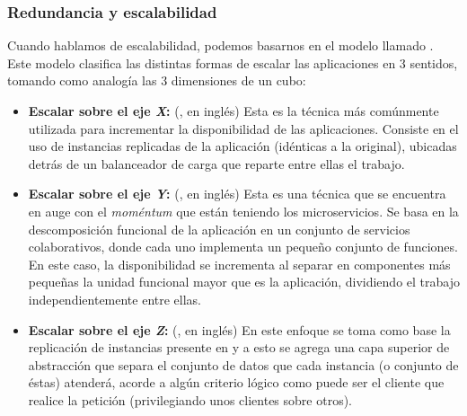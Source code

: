 \subsubsection{Redundancia y escalabilidad}


Cuando hablamos de escalabilidad, podemos basarnos en el modelo llamado \cite{website:akfpartners-scale-cube}. Este modelo clasifica las distintas formas de escalar las aplicaciones en 3 sentidos, tomando como analogía las 3 dimensiones de un cubo:

\begin{itemize}
  \item \textbf{Escalar sobre el eje \textit{X}:} (, en inglés) Esta es la técnica más comúnmente utilizada para incrementar la disponibilidad de las aplicaciones. Consiste en el uso de instancias replicadas de la aplicación (idénticas a la original), ubicadas detrás de un balanceador de carga que reparte entre ellas el trabajo.
  \item \textbf{Escalar sobre el eje \textit{Y}:} (, en inglés) Esta es una técnica que se encuentra en auge con el \textit{moméntum} que están teniendo los microservicios. Se basa en la descomposición funcional de la aplicación en un conjunto de servicios colaborativos, donde cada uno implementa un pequeño conjunto de funciones. En este caso, la disponibilidad se incrementa al separar en componentes más pequeñas la unidad funcional mayor que es la aplicación, dividiendo el trabajo independientemente entre ellas.
  \item \textbf{Escalar sobre el eje \textit{Z}:} (, en inglés) En este enfoque se toma como base la replicación de instancias presente en  y a esto se agrega una capa superior de abstracción que separa el conjunto de datos que cada instancia (o conjunto de éstas) atenderá, acorde a algún criterio lógico como puede ser el cliente que realice la petición (privilegiando unos clientes sobre otros).
\end{itemize}

